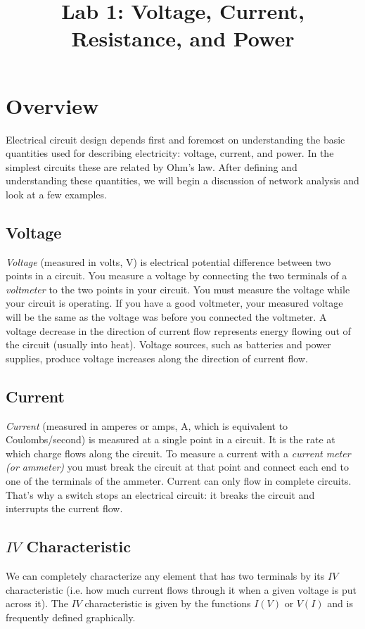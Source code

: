 \documentclass{article}
\title{Lab 1: Voltage, Current, Resistance, and Power}
\begin{document}
\maketitle

\section{Overview}
Electrical circuit design depends first and foremost on understanding the basic quantities used for describing electricity: voltage, current, and power. In the simplest circuits these are related by Ohm's law. After defining and understanding these quantities, we will begin a discussion of network analysis and look at a few examples.

\subsection{Voltage}
\emph{Voltage} (measured in volts, V) is electrical potential difference between two points in a circuit. You measure a voltage by connecting the two terminals of a \emph{voltmeter} to the two points in your circuit. You must measure the voltage while your circuit is operating. If you have a good voltmeter, your measured voltage will be the same as the voltage was before you connected the voltmeter. A voltage decrease in the direction of current flow represents energy flowing out of the circuit (usually into heat). Voltage sources, such as batteries and power supplies, produce voltage increases along the direction of current
flow.

\subsection{Current}
\emph{Current} (measured in amperes or amps, A, which is equivalent to Coulombs/second) is measured at a single point in a circuit. It is the rate at which charge flows along the circuit. To measure a current with a \emph{current meter (or ammeter)} you must break the circuit at that point and connect each end to one of the terminals of the ammeter. Current can only flow in complete circuits. That's why a switch stops an electrical circuit: it breaks the circuit and interrupts the current flow.

\subsection{\boldmath$IV$ Characteristic}
We can completely characterize any element that has two terminals by its $IV$ characteristic (i.e. how much current flows through it when a given voltage is put across it). The $IV$ characteristic is given by the functions $I(V)$ or $V(I)$ and is frequently defined graphically.  
\end{document}
